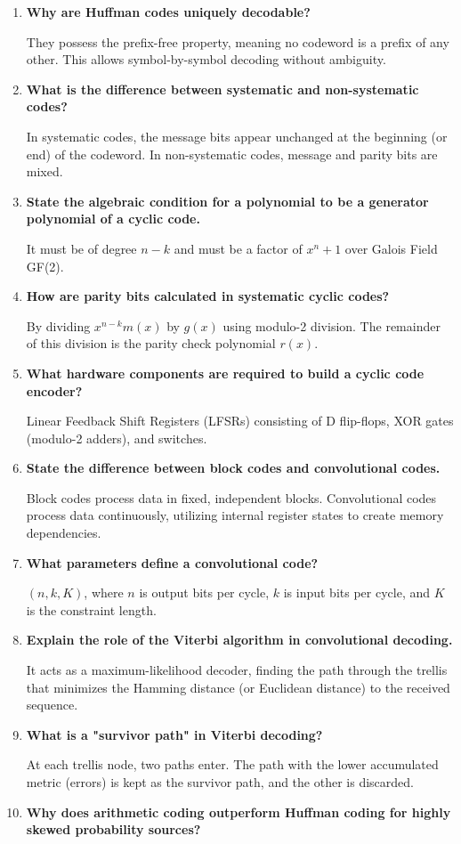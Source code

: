 \documentclass[12pt,a4paper]{article}
\newcommand{\Q}[1]{\textbf{#1}\par\noindent\ignorespaces}
\begin{document}
\begin{tcolorbox}[exambox, title={\textbf{Frequently Asked / Viva Questions}}]
\begin{enumerate}[topsep=0pt, label=\textbf{Q\arabic*.}, itemsep=5pt]
  \item \Q{Why are Huffman codes uniquely decodable?}
    They possess the prefix-free property, meaning no codeword is a prefix of any other. This allows symbol-by-symbol decoding without ambiguity.
  \item \Q{What is the difference between systematic and non-systematic codes?}
    In systematic codes, the message bits appear unchanged at the beginning (or end) of the codeword. In non-systematic codes, message and parity bits are mixed.
  \item \Q{State the algebraic condition for a polynomial to be a generator polynomial of a cyclic code.}
    It must be of degree $n-k$ and must be a factor of $x^n + 1$ over Galois Field GF(2).
  \item \Q{How are parity bits calculated in systematic cyclic codes?}
    By dividing $x^{n-k} m(x)$ by $g(x)$ using modulo-2 division. The remainder of this division is the parity check polynomial $r(x)$.
  \item \Q{What hardware components are required to build a cyclic code encoder?}
    Linear Feedback Shift Registers (LFSRs) consisting of D flip-flops, XOR gates (modulo-2 adders), and switches.
  \item \Q{State the difference between block codes and convolutional codes.}
    Block codes process data in fixed, independent blocks. Convolutional codes process data continuously, utilizing internal register states to create memory dependencies.
  \item \Q{What parameters define a convolutional code?}
    $(n, k, K)$, where $n$ is output bits per cycle, $k$ is input bits per cycle, and $K$ is the constraint length.
  \item \Q{Explain the role of the Viterbi algorithm in convolutional decoding.}
    It acts as a maximum-likelihood decoder, finding the path through the trellis that minimizes the Hamming distance (or Euclidean distance) to the received sequence.
  \item \Q{What is a "survivor path" in Viterbi decoding?}
    At each trellis node, two paths enter. The path with the lower accumulated metric (errors) is kept as the survivor path, and the other is discarded.
  \item \Q{Why does arithmetic coding outperform Huffman coding for highly skewed probability sources?}

\end{enumerate}
\end{tcolorbox}
\end{document}

